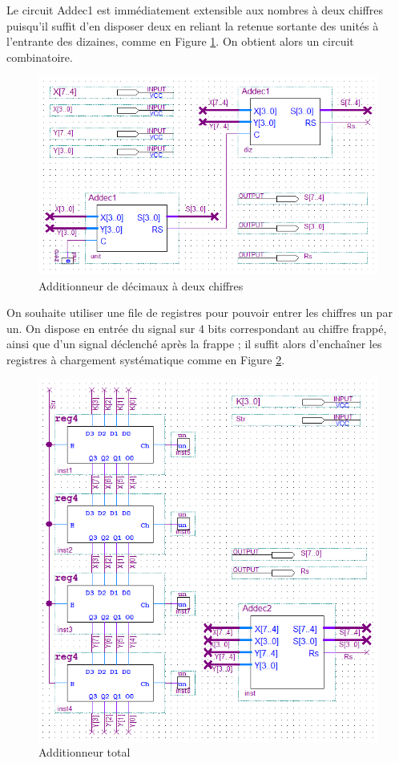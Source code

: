 \documentclass[a4paper,11pt]{article}
\begin{document}
Le circuit Addec1 est immédiatement extensible aux nombres à deux chiffres puisqu'il suffit d'en disposer deux en reliant la retenue sortante des unités à l'entrante des dizaines, comme en Figure \ref{addec2}. On obtient alors un circuit combinatoire.

\clearpage

\begin{figure}[h]
\center
\includegraphics[scale=0.5]{addec2.PNG}
\caption{Additionneur de décimaux à deux chiffres}
\label{addec2}
\end{figure}

On souhaite utiliser une file de registres pour pouvoir entrer les chiffres un par un. On dispose en entrée du signal sur 4 bits correspondant au chiffre frappé, ainsi que d'un signal déclenché après la frappe ; il suffit alors d'enchaîner les registres à chargement systématique comme en Figure \ref{addec2total}.

\begin{figure}[h]
\center
\includegraphics[scale=0.5]{addec2total.PNG}
\caption{Additionneur total}
\label{addec2total}
\end{figure}
\end{document}
